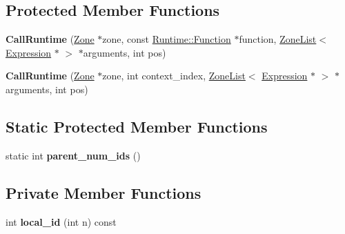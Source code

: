 \subsection*{Protected Member Functions}
\begin{DoxyCompactItemize}
\item 
{\bfseries Call\+Runtime} (\hyperlink{classv8_1_1internal_1_1_zone}{Zone} $\ast$zone, const \hyperlink{structv8_1_1internal_1_1_runtime_1_1_function}{Runtime\+::\+Function} $\ast$function, \hyperlink{classv8_1_1internal_1_1_zone_list}{Zone\+List}$<$ \hyperlink{classv8_1_1internal_1_1_expression}{Expression} $\ast$ $>$ $\ast$arguments, int pos)\hypertarget{classv8_1_1internal_1_1_call_runtime_a93242140aa0126cf1ad0a0b39b2b9e95}{}\label{classv8_1_1internal_1_1_call_runtime_a93242140aa0126cf1ad0a0b39b2b9e95}

\item 
{\bfseries Call\+Runtime} (\hyperlink{classv8_1_1internal_1_1_zone}{Zone} $\ast$zone, int context\+\_\+index, \hyperlink{classv8_1_1internal_1_1_zone_list}{Zone\+List}$<$ \hyperlink{classv8_1_1internal_1_1_expression}{Expression} $\ast$ $>$ $\ast$arguments, int pos)\hypertarget{classv8_1_1internal_1_1_call_runtime_a6423f527596dd51b8af36e762f536443}{}\label{classv8_1_1internal_1_1_call_runtime_a6423f527596dd51b8af36e762f536443}

\end{DoxyCompactItemize}
\subsection*{Static Protected Member Functions}
\begin{DoxyCompactItemize}
\item 
static int {\bfseries parent\+\_\+num\+\_\+ids} ()\hypertarget{classv8_1_1internal_1_1_call_runtime_a37c3f9725c4dadaecdd2fec6651d023e}{}\label{classv8_1_1internal_1_1_call_runtime_a37c3f9725c4dadaecdd2fec6651d023e}

\end{DoxyCompactItemize}
\subsection*{Private Member Functions}
\begin{DoxyCompactItemize}
\item 
int {\bfseries local\+\_\+id} (int n) const \hypertarget{classv8_1_1internal_1_1_call_runtime_a899b0e71b05a4d2d7c5c7c43ff06dc21}{}\label{classv8_1_1internal_1_1_call_runtime_a899b0e71b05a4d2d7c5c7c43ff06dc21}

\end{DoxyCompactItemize}
